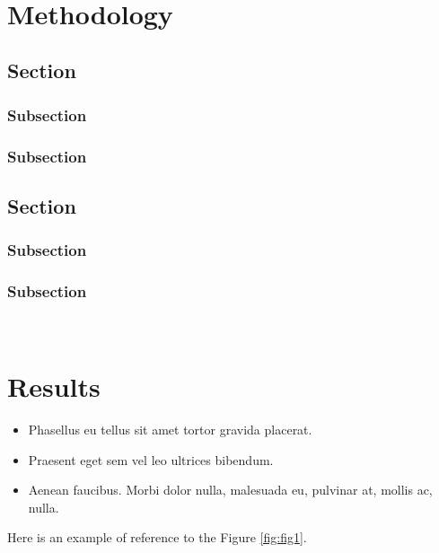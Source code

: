 \newEmptyPage\
\chapter{Methodology}

\lipsum[1]

    \section{Section}
    \lipsum[1]
    
        \subsection{Subsection}
        \lipsum[1]
        
        \subsection{Subsection}
        \lipsum[2]

    \section{Section}
    \lipsum[1]
    
        \subsection{Subsection}
        \lipsum[1]
        
        \subsection{Subsection}
        \lipsum[2]

\newEmptyPage\
\chapter{Results}
\lipsum[1]

    \begin{itemize}
      \item Phasellus eu tellus sit amet tortor gravida placerat.
      \item Praesent eget sem vel leo ultrices bibendum.
      \item Aenean faucibus. Morbi dolor nulla, malesuada eu, pulvinar at, mollis ac, nulla.
    \end{itemize}
    
 \lipsum[2]
 Here is an example of reference to the Figure \ref{fig:fig1}. 

